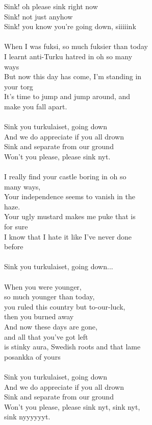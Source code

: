
Sink! oh please sink right now \\ Sink! not just anyhow \\ Sink! you know you're going down, siiiiink \\ \hspace{10mm} \\ When I was fuksi, so much fuksier than today \\ I learnt anti-Turku hatred in oh so many \\ ways \\ But now this day has come, I'm standing in \\ your torg \\ It's time to jump and jump around, and \\ make you fall apart. \\ \hspace{10mm} \\ Sink you turkulaiset, going down \\ And we do appreciate if you all drown \\ Sink and separate from our ground \\ Won't you please, please sink nyt. \\ \hspace{10mm} \\ I really find your castle boring in oh so \\ many ways, \\ Your independence seems to vanish in the \\ haze. \\ Your ugly mustard makes me puke that is \\ for sure \\ I know that I hate it like I've never done \\ before \\ \hspace{10mm} \\ Sink you turkulaiset, going down... \\ \hspace{10mm} \\ When you were younger, \\ so much younger than today, \\ you ruled this country but to-our-luck, \\ then you burned away \\ And now these days are gone, \\ and all that you've got left \\ is stinky aura, Swedish roots and that lame \\ posankka of yours \\ \hspace{10mm} \\ Sink you turkulaiset, going down \\ And we do appreciate if you all drown \\ Sink and separate from our ground \\ Won't you please, please sink nyt, sink nyt, \\ sink nyyyyyyt.